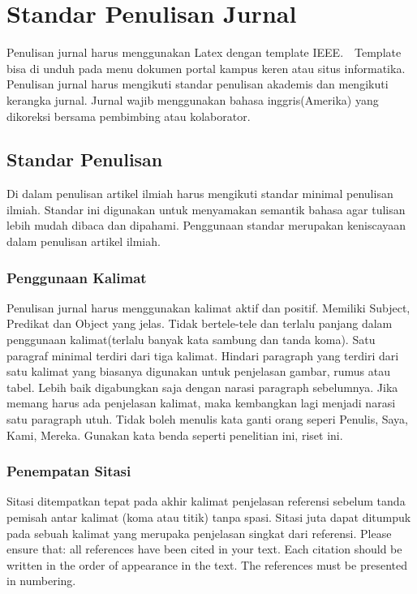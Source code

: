 \chapter{Standar Penulisan Jurnal}

Penulisan jurnal harus menggunakan Latex dengan template IEEE.　Template bisa di unduh pada menu dokumen portal kampus keren atau situs informatika. Penulisan jurnal harus mengikuti standar penulisan akademis dan mengikuti kerangka jurnal. Jurnal wajib menggunakan bahasa inggris(Amerika) yang dikoreksi bersama pembimbing atau kolaborator. 

\section{Standar Penulisan}
Di dalam penulisan artikel ilmiah harus mengikuti standar minimal penulisan ilmiah. Standar ini digunakan untuk menyamakan semantik bahasa agar tulisan lebih mudah dibaca dan dipahami. Penggunaan standar merupakan keniscayaan dalam penulisan artikel ilmiah.
\subsection{Penggunaan Kalimat}
Penulisan jurnal harus menggunakan kalimat aktif dan positif. Memiliki Subject, Predikat dan Object yang jelas. Tidak bertele-tele dan terlalu panjang dalam penggunaan kalimat(terlalu banyak kata sambung dan tanda koma). Satu paragraf minimal terdiri dari tiga kalimat. Hindari paragraph yang terdiri dari satu kalimat yang biasanya digunakan untuk penjelasan gambar, rumus atau tabel. Lebih baik digabungkan saja dengan narasi paragraph sebelumnya. Jika memang harus ada penjelasan kalimat, maka kembangkan lagi menjadi narasi satu paragraph utuh. Tidak boleh menulis kata ganti orang seperi Penulis, Saya, Kami, Mereka. Gunakan kata benda seperti penelitian ini, riset ini.

\subsection{Penempatan Sitasi}
Sitasi ditempatkan tepat pada akhir kalimat penjelasan referensi sebelum tanda 
pemisah antar kalimat (koma atau titik) tanpa spasi. 
Sitasi juta dapat ditumpuk pada sebuah kalimat yang merupaka  penjelasan singkat dari referensi. 
Please ensure that: all references have been cited in your text. Each citation should be written in the order of appearance in the text. The references must be presented in numbering. 

